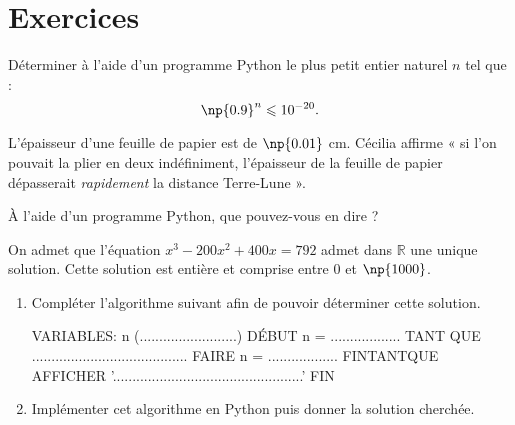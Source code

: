 \documentclass[activite]{mathsRC}
\begin{document}
\newpage
\section*{Exercices}

\begin{exercice}
Déterminer à l'aide d'un programme Python le plus petit entier naturel $n$ tel que :
\[
\np{0.9}^n\leq 10^{-20}.
\]
\end{exercice}

\begin{exercice}
L'épaisseur d'une feuille de papier est de $\np{0.01}$ cm. Cécilia affirme « si l'on pouvait la plier en deux indéfiniment, l'épaisseur de la feuille de papier dépasserait \textit{rapidement} la distance Terre-Lune ».

À l'aide d'un programme Python, que pouvez-vous en dire ?
\end{exercice}

\begin{exercice}
On admet que l'équation $x^3-200x^2+400x=792$ admet dans $\mathbb{R}$ une unique solution. Cette solution est entière et comprise entre $0$ et $\np{1000}$.
\begin{enumerate}
\item
Compléter l'algorithme suivant afin de pouvoir déterminer cette solution.

\begin{algorithme}
VARIABLES: n (.........................)
DÉBUT
n = ..................
TANT QUE ........................................ FAIRE
	n = ..................
FINTANTQUE
AFFICHER '.................................................'
FIN
\end{algorithme}

\item
Implémenter cet algorithme en Python puis donner la solution cherchée.
\end{enumerate}
\end{exercice}


\end{document}
